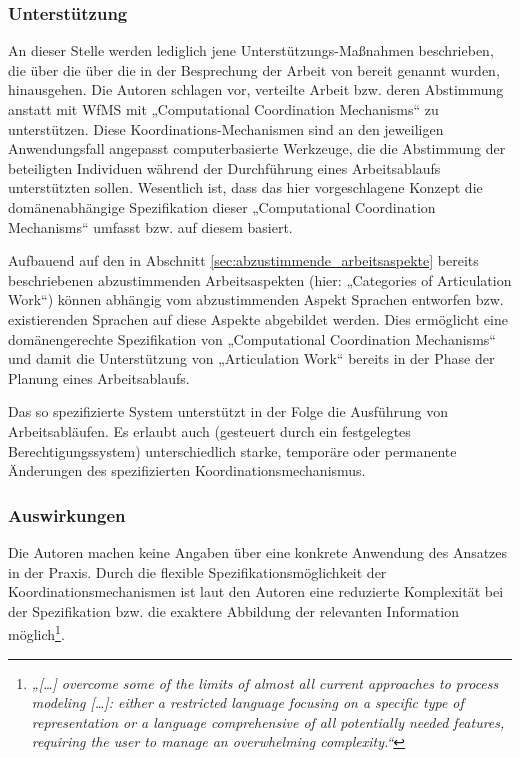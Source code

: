 \subsubsection{Unterstützung}

An dieser Stelle werden lediglich jene Unterstützungs-Maßnahmen beschrieben, die über die über die in der Besprechung der Arbeit von \citet{Schmidt96} bereit genannt wurden, hinausgehen. Die Autoren schlagen vor, verteilte Arbeit bzw. deren Abstimmung anstatt mit \gls{WfMS} mit „Computational Coordination Mechanisms“ zu unterstützen. Diese Koordinations-Mechanismen sind an den jeweiligen Anwendungsfall angepasst computerbasierte Werkzeuge, die die Abstimmung der beteiligten Individuen während der Durchführung eines Arbeitsablaufs unterstützten sollen. Wesentlich ist, dass das hier vorgeschlagene Konzept die domänenabhängige Spezifikation dieser „Computational Coordination Mechanisms“ umfasst bzw. auf diesem basiert. 

Aufbauend auf den in Abschnitt \ref{sec:abzustimmende_arbeitsaspekte} bereits beschriebenen abzustimmenden Arbeitsaspekten (hier: „Categories of Articulation Work“) können abhängig vom abzustimmenden Aspekt Sprachen entworfen bzw. existierenden Sprachen auf diese Aspekte abgebildet werden. Dies ermöglicht eine domänengerechte Spezifikation von „Computational Coordination Mechanisms“ und damit die Unterstützung von „Articulation Work“ bereits in der Phase der Planung eines Arbeitsablaufs. 

Das so spezifizierte System unterstützt in der Folge die Ausführung von Arbeitsabläufen. Es erlaubt auch (gesteuert durch ein festgelegtes Berechtigungssystem) unterschiedlich starke, temporäre oder permanente Änderungen des spezifizierten Koordinationsmechanismus.

\subsubsection{Auswirkungen}

Die Autoren machen keine Angaben über eine konkrete Anwendung des Ansatzes in der Praxis. Durch die flexible Spezifikationsmöglichkeit der Koordinationsmechanismen ist laut den Autoren eine reduzierte Komplexität bei der Spezifikation bzw. die exaktere Abbildung der relevanten Information möglich\footnote{\emph{„[\ldots] overcome some of the limits of 
almost all current approaches to process modeling [\ldots]: either a restricted language focusing on a speciﬁc type of representation or a language comprehensive of all potentially needed features, requiring the user to manage an overwhelming complexity.“}\citep[][S. 377]{Divitini00}}.

